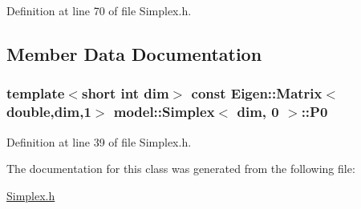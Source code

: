 Definition at line 70 of file Simplex.\+h.



\subsection{Member Data Documentation}
\hypertarget{classmodel_1_1_simplex_3_01dim_00_010_01_4_ad6cd6c3e05d9f3fd3abfddba8b48c699}{}
\subsubsection[{P0}]{\setlength{\rightskip}{0pt plus 5cm}template$<$short int dim$>$ const Eigen\+::\+Matrix$<$double,{\bf dim},1$>$ {\bf model\+::\+Simplex}$<$ {\bf dim}, 0 $>$\+::P0}\label{classmodel_1_1_simplex_3_01dim_00_010_01_4_ad6cd6c3e05d9f3fd3abfddba8b48c699}


Definition at line 39 of file Simplex.\+h.



The documentation for this class was generated from the following file\+:\begin{DoxyCompactItemize}
\item 
\hyperlink{_simplex_8h}{Simplex.\+h}\end{DoxyCompactItemize}
